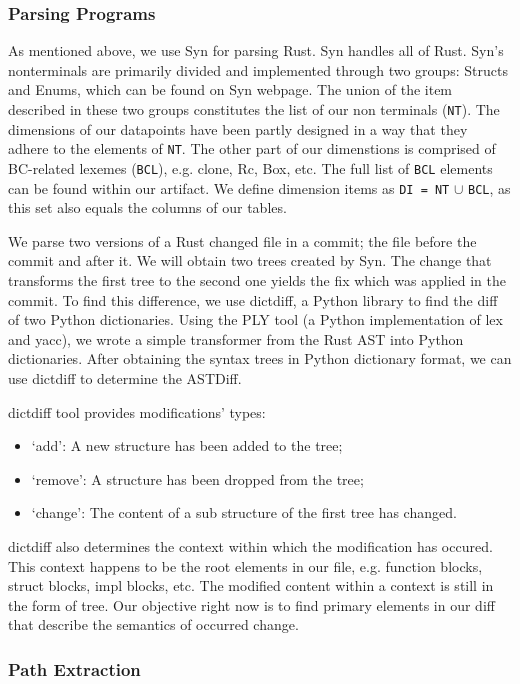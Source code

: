 \subsubsection{Parsing Programs}

As mentioned above, we use Syn for parsing Rust. Syn handles all of Rust. Syn's nonterminals are primarily divided and implemented through two groups: Structs and Enums, which can be found on Syn webpage. The union of the item described in these two groups constitutes the list of our non terminals (\verb+NT+). The dimensions of our datapoints have been partly designed in a way that they adhere to the elements of \verb+NT+. The other part of our dimenstions is comprised of BC-related lexemes (\verb+BCL+), e.g. clone, Rc, Box, etc. The full list of \verb+BCL+ elements can be found within our artifact. We define dimension items as \verb+DI = NT+ $\cup$ \verb+BCL+, as this set also equals the columns of our tables.

We parse two versions of a Rust changed file in a commit; the file before the commit and after it. We will obtain two trees created by Syn. The change that transforms the first tree to the second one yields the fix which was applied in the commit. To find this difference, we use dictdiff, a Python library to find the diff of two Python dictionaries. Using the PLY tool (a Python implementation of lex and yacc), we wrote a simple transformer from the Rust AST into Python dictionaries. After obtaining the syntax trees in Python dictionary format, we can use dictdiff to determine the ASTDiff. 

dictdiff tool provides modifications' types: 
\begin{itemize}
\item `add': A new structure has been added to the tree; 
\item `remove': A structure has been dropped from the tree; 
\item `change': The content of a sub structure of the first tree has changed.
\end{itemize}
dictdiff also determines the context within which the modification has occured. This context happens to be the root elements in our file, e.g. function blocks, struct blocks, impl blocks, etc. The modified content within a context is still in the form of tree. Our objective right now is to find primary elements in our diff that describe the semantics of occurred change.

\subsubsection{Path Extraction}


